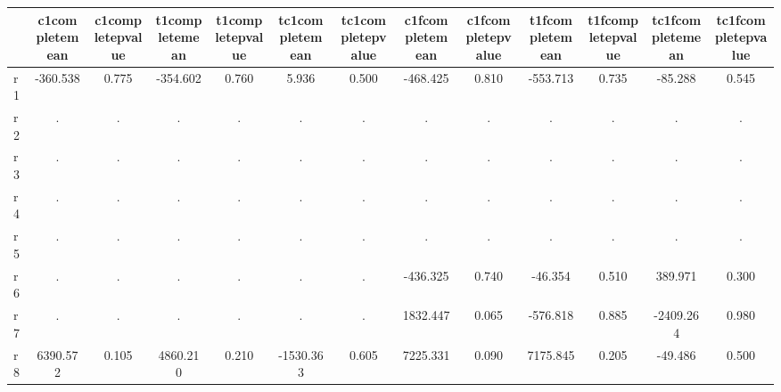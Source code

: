 \begin{table}[htbp]
\begin{tabular}{lcccccccccccc} \hline \hline
 & c1completemean  & c1completepvalue  & t1completemean  & t1completepvalue  & tc1completemean  & tc1completepvalue  & c1fcompletemean  & c1fcompletepvalue  & t1fcompletemean  & t1fcompletepvalue  & tc1fcompletemean  & tc1fcompletepvalue  \\  \hline 
r1 &  -360.538 &     0.775 &  -354.602 &     0.760 &     5.936 &     0.500 &  -468.425 &     0.810 &  -553.713 &     0.735 &   -85.288 &     0.545 \\  
r2 &         . &         . &         . &         . &         . &         . &         . &         . &         . &         . &         . &         . \\  
r3 &         . &         . &         . &         . &         . &         . &         . &         . &         . &         . &         . &         . \\  
r4 &         . &         . &         . &         . &         . &         . &         . &         . &         . &         . &         . &         . \\  
r5 &         . &         . &         . &         . &         . &         . &         . &         . &         . &         . &         . &         . \\  
r6 &         . &         . &         . &         . &         . &         . &  -436.325 &     0.740 &   -46.354 &     0.510 &   389.971 &     0.300 \\  
r7 &         . &         . &         . &         . &         . &         . &  1832.447 &     0.065 &  -576.818 &     0.885 & -2409.264 &     0.980 \\  
r8 &  6390.572 &     0.105 &  4860.210 &     0.210 & -1530.363 &     0.605 &  7225.331 &     0.090 &  7175.845 &     0.205 &   -49.486 &     0.500 \\  
\hline \hline \end{tabular}
\end{table}
